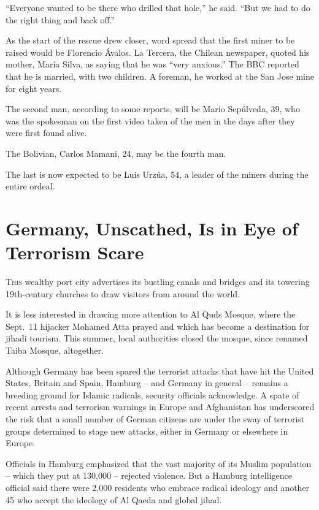 ﻿\documentclass[12pt]{article}
\begin{document}
``Everyone wanted to be there who drilled that hole,'' he said. ``But we had to do the right thing
and back off.''

As the start of the rescue drew closer, word spread that the first miner to be raised would be
Florencio \'Avalos. La Tercera, the Chilean newspaper, quoted his mother, María Silva, as saying
that he was ``very anxious.'' The BBC reported that he is married, with two children. A foreman, he
worked at the San Jose mine for eight years.

The second man, according to some reports, will be Mario Sepúlveda, 39, who was the spokesman on
the first video taken of the men in the days after they were first found alive.

The Bolivian, Carlos Mamani, 24, may be the fourth man.

The last is now expected to be Luis Urzúa, 54, a leader of the miners during the entire ordeal.

\section{Germany, Unscathed, Is in Eye of Terrorism Scare}

\lettrine{T}{his} wealthy port city advertises its bustling canals and
bridges and its towering 19th-century churches to draw visitors from around the world.

It is less interested in drawing more attention to Al Quds Mosque, where the Sept.~11 hijacker
Mohamed Atta prayed and which has become a destination for jihadi tourism. This summer, local
authorities closed the mosque, since renamed Taiba Mosque, altogether.

Although Germany has been spared the terrorist attacks that have hit the United States, Britain and
Spain, Hamburg -- and Germany in general -- remains a breeding ground for Islamic radicals, security
officials acknowledge. A spate of recent arrests and terrorism warnings in Europe and Afghanistan
has underscored the risk that a small number of German citizens are under the sway of terrorist
groups determined to stage new attacks, either in Germany or elsewhere in Europe.

Officials in Hamburg emphasized that the vast majority of its Muslim population -- which they put at
130,000 -- rejected violence. But a Hamburg intelligence official said there were 2,000 residents
who embrace radical ideology and another 45 who accept the ideology of Al Qaeda and global jihad.
\end{document}

